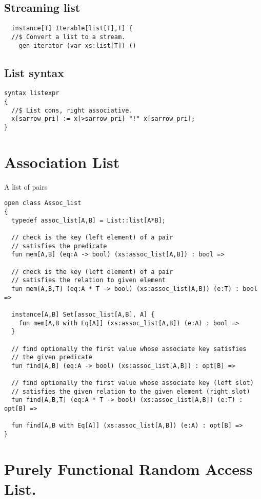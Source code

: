\documentclass[oneside]{book}
\begin{document}
{\subsection{Streaming list}
\begin{verbatim}
  instance[T] Iterable[list[T],T] {
  //$ Convert a list to a stream.
    gen iterator (var xs:list[T]) ()
\end{verbatim}

\subsection{List syntax}

\begin{verbatim}
syntax listexpr
{
  //$ List cons, right associative.
  x[sarrow_pri] := x[>sarrow_pri] "!" x[sarrow_pri]; 
}
\end{verbatim}

\section{Association List}
A list of pairs

\begin{verbatim}
open class Assoc_list
{
  typedef assoc_list[A,B] = List::list[A*B];

  // check is the key (left element) of a pair
  // satisfies the predicate
  fun mem[A,B] (eq:A -> bool) (xs:assoc_list[A,B]) : bool =>

  // check is the key (left element) of a pair
  // satisfies the relation to given element 
  fun mem[A,B,T] (eq:A * T -> bool) (xs:assoc_list[A,B]) (e:T) : bool =>

  instance[A,B] Set[assoc_list[A,B], A] {
    fun mem[A,B with Eq[A]] (xs:assoc_list[A,B]) (e:A) : bool => 
  }

  // find optionally the first value whose associate key satisfies 
  // the given predicate
  fun find[A,B] (eq:A -> bool) (xs:assoc_list[A,B]) : opt[B] =>

  // find optionally the first value whose associate key (left slot)
  // satisfies the given relation to the given element (right slot) 
  fun find[A,B,T] (eq:A * T -> bool) (xs:assoc_list[A,B]) (e:T) : opt[B] =>

  fun find[A,B with Eq[A]] (xs:assoc_list[A,B]) (e:A) : opt[B] =>
}
\end{verbatim}

\section{Purely Functional Random Access List.}

}
\end{document}
